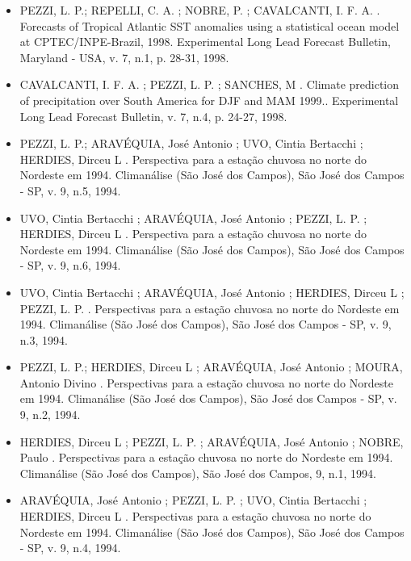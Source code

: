 \documentclass[11pt, a4paper]{awesome-cv}
\begin{document}
\begin{cvletter}
\begin{itemize}
  \item[] PEZZI, L. P.; REPELLI, C. A. ; NOBRE, P. ; CAVALCANTI, I. F. A. . Forecasts of Tropical 
  Atlantic SST anomalies using a statistical ocean model at CPTEC/INPE-Brazil, 1998. Experimental 
  Long Lead Forecast Bulletin, Maryland - USA, v. 7, n.1, p. 28-31, 1998. 

  \item[] 
  CAVALCANTI, I. F. A. ; PEZZI, L. P. ; SANCHES, M . Climate prediction of precipitation over South 
  America for DJF and MAM 1999.. Experimental Long Lead Forecast Bulletin, v. 7, n.4, p. 24-27, 
  1998. 

  \item[] PEZZI, L. P.; ARAVÉQUIA, José Antonio ; UVO, Cintia Bertacchi ; HERDIES, Dirceu L . 
  Perspectiva para a estação chuvosa no norte do Nordeste em 1994. Climanálise (São José dos Campos), 
  São José dos Campos - SP, v. 9, n.5, 1994. 

  \item[] UVO, Cintia Bertacchi ; ARAVÉQUIA, José Antonio ; PEZZI, L. P. ; HERDIES, Dirceu L . 
  Perspectiva para a estação chuvosa no norte do Nordeste em 1994. Climanálise (São José dos Campos), 
  São José dos Campos - SP, v. 9, n.6, 1994. 

  \item[] UVO, Cintia Bertacchi ; ARAVÉQUIA, José Antonio ; HERDIES, Dirceu L ; PEZZI, L. P. . 
  Perspectivas para a estação chuvosa no norte do Nordeste em 1994. Climanálise (São José dos Campos), 
  São José dos Campos - SP, v. 9, n.3, 1994. 

  \item[] 
  PEZZI, L. P.; HERDIES, Dirceu L ; ARAVÉQUIA, José Antonio ; MOURA, Antonio Divino . 
  Perspectivas para a estação chuvosa no norte do Nordeste em 1994. Climanálise (São José dos Campos), 
  São José dos Campos - SP, v. 9, n.2, 1994. 

  \item[] 
  HERDIES, Dirceu L ; PEZZI, L. P. ; ARAVÉQUIA, José Antonio ; NOBRE, Paulo . Perspectivas para a 
  estação chuvosa no norte do Nordeste em 1994. Climanálise (São José dos Campos), São José dos Campos, 
   9, n.1, 1994. 

  \item[] 
  ARAVÉQUIA, José Antonio ; PEZZI, L. P. ; UVO, Cintia Bertacchi ; HERDIES, Dirceu L . Perspectivas 
  para a estação chuvosa no norte do Nordeste em 1994. Climanálise (São José dos Campos), 
  São José dos Campos - SP, v. 9, n.4, 1994. 
\end{itemize}


\end{cvletter}
\end{document}
